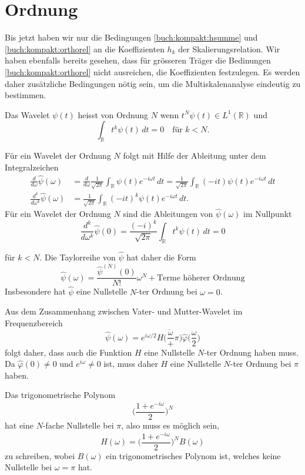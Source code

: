 %
%
%
\section{Ordnung\label{section:ordnung}}
Bis jetzt haben wir nur die Bedingungen \eqref{buch:kompakt:hsumme}
und \eqref{buch:kompakt:orthorel} an die Koeffizienten 
$h_k$ der Skalierungsrelation.
Wir haben ebenfalls bereits gesehen, dass für grösseren Träger die
Bedinungen \eqref{buch:kompakt:orthorel} nicht ausreichen, die
Koeffizienten festzulegen.
Es werden daher zusätzliche Bedingungen nötig sein, um die
Multiskalenanalyse eindeutig zu bestimmen.

\begin{definition}
Das Wavelet $\psi(t)$ heisst von Ordnung $N$ wenn
$t^N\psi(t)\in L^1(\mathbb R)$ und
\[
\int_{\mathbb R} t^k\psi(t)\,dt=0\quad \text{für $k<N$.}
\]
\end{definition}

Für ein Wavelet der Ordnung $N$ folgt mit Hilfe der Ableitung unter
dem Integralzeichen
\begin{align*}
\frac{d}{d\omega}
\hat{\psi}(\omega)
&=
\frac{d}{d\omega}
\frac{1}{\sqrt{2\pi}}
\int_{\mathbb R}
\psi(t) e^{-i\omega t}\,dt
=
\frac{1}{\sqrt{2\pi}}
\int_{\mathbb R}
(-it)
\psi(t) e^{-i\omega t}\,dt
\\
\frac{d^k}{d\omega^k}
\hat{\psi}(\omega)
&=
\frac{1}{\sqrt{2\pi}}
\int_{\mathbb R}
(-it)^k
\psi(t) e^{-i\omega t}\,dt.
\end{align*}
Für ein Wavelet der Ordnung $N$ sind die Ableitungen von $\hat{\psi}(\omega)$
im Nullpunkt
\[
\frac{d^k}{d\omega^k}
\hat{\psi}(0)
=
\frac{(-i)^k}{\sqrt{2\pi}}
\int_{\mathbb R} t^k \psi(t) \,dt = 0
\]

für $k<N$. 
Die Taylorreihe von $\hat{\psi}$ hat daher die Form
\[
\hat{\psi}(\omega)
=
\frac{\hat{\psi}^{(N)}(0)}{N!} \omega^N + \text{Terme höherer Ordnung}
\]
Insbesondere hat $\hat{\psi}$ eine Nullstelle $N$-ter Ordnung bei $\omega=0$.

Aus dem Zusammenhang zwischen Vater- und Mutter-Wavelet im Frequenzbereich
\[
\hat{\psi}(\omega)
=
e^{i\omega/2}
\overline{H\biggl(\frac{\omega}+\pi\biggr)}
\hat{\varphi}\biggl(\frac{\omega}2\biggr)
\]
folgt daher, dass auch die Funktion $H$ eine Nullstelle $N$-ter
Ordnung haben muss.
Da $\hat{\varphi}(0)\ne 0$ und $e^{i\omega}\ne 0$ ist, muss daher
$H$ eine Nullstelle $N$-ter Ordnung bei $\pi$ haben.

Das trigonometrische Polynom
\[
\biggl(
\frac{1+e^{-i\omega}}{2}
\biggr)^N
\]
hat eine $N$-fache Nullstelle bei $\pi$, also muss es möglich sein,
\begin{equation}
H(\omega)
= 
\biggl(
\frac{1+e^{-i\omega}}{2}
\biggr)^N B(\omega)
\label{buch:kompakt:HB}
\end{equation}
zu schreiben, wobei $B(\omega)$ ein trigonometrisches Polynom ist,
welches keine Nullstelle bei $\omega=\pi$ hat.

